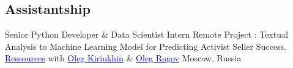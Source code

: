 \newpage

\subsection{\textbf{Assistantship}}

    {Senior Python Developer \& Data Scientist Intern}
    {Remote}
    {
    \newline
    Project : Textual Analysis to Machine Learning Model for Predicting Activist Seller Success.
    \href{https://www.linkedin.com/posts/daglox-kankwanda-59a617182_short-activist-predictor-activity-7129183448644083712-BFpY?utm_source=share&utm_medium=member_desktop}{\textcolor{blue}{Ressources}} 
    with \href{https://linkedin.com/in/kiryukhin}{\textcolor{blue}{Oleg Kiriukhin}} \& \href{https://linkedin.com/in/oleg3372}{\textcolor{blue}{Oleg Rogov}}
    }
    {Moscow, Russia}
